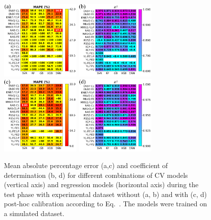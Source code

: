 \documentclass[10pt]{iopart}
\begin{document}
\begin{figure}
\centering
\includegraphics[width=0.35\textwidth]{Fig7a}
\includegraphics[width=0.35\textwidth]{Fig7b}
\includegraphics[width=0.35\textwidth]{Fig7c}
\includegraphics[width=0.35\textwidth]{Fig7d}
\caption{
Mean absolute percentage error (a,c) and coefficient of determination (b, d) for different combinations of CV models (vertical axis)
and regression models (horizontal axis) during the test phase with experimental dataset without (a, b) and with (c, d)
post-hoc calibration according to Eq.~.
The models were trained on a simulated dataset.
}\label{Fig7}
\end{figure}
\end{document}
